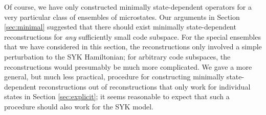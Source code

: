 \documentclass[12pt]{article}
\begin{document}
Of course, we have only constructed minimally state-dependent operators for a very particular class of ensembles of microstates. Our arguments in Section \ref{sec:minimal} suggested that there should exist minimally state-dependent reconstructions for \emph{any} sufficiently small code subspace. For the special ensembles that we have considered in this section, the reconstructions only involved a simple perturbation to the SYK Hamiltonian; for arbitrary code subspaces, the reconstructions would presumably be much more complicated. We gave a more general, but much less practical, procedure for constructing minimally state-dependent reconstructions out of reconstructions that only work for individual states in Section \ref{sec:explicit}; it seems reasonable to expect that such a procedure should also work for the SYK model.






\end{document}
